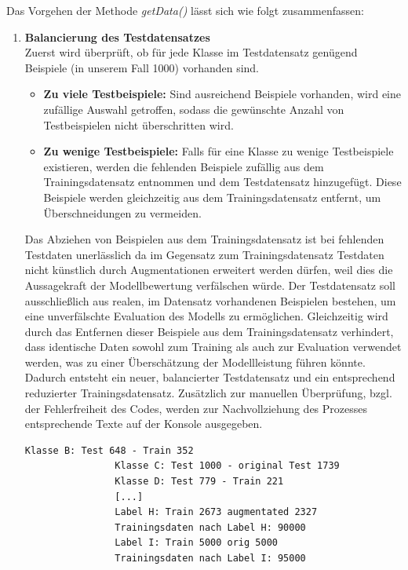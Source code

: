 \documentclass[12pt,oneside]{article}
\begin{document}
			Das Vorgehen der Methode \textit{getData()} lässt sich wie folgt zusammenfassen:
			\begin{enumerate}
				\item \textbf{Balancierung des Testdatensatzes} \\
				Zuerst wird überprüft, ob für jede Klasse im Testdatensatz genügend Beispiele (in unserem Fall 1000) vorhanden sind.
				\begin{itemize}
					\item \textbf{Zu viele Testbeispiele:} Sind ausreichend Beispiele vorhanden, wird eine zufällige Auswahl getroffen, sodass die gewünschte Anzahl von Testbeispielen nicht überschritten wird.
					\item \textbf{Zu wenige Testbeispiele:} Falls für eine Klasse zu wenige Testbeispiele existieren, werden die fehlenden Beispiele zufällig aus dem Trainingsdatensatz entnommen und dem Testdatensatz hinzugefügt. Diese Beispiele werden gleichzeitig aus dem Trainingsdatensatz entfernt, um Überschneidungen zu vermeiden.
				\end{itemize}
				
				Das Abziehen von Beispielen aus dem Trainingsdatensatz ist bei fehlenden Testdaten unerlässlich da im Gegensatz zum Trainingsdatensatz Testdaten nicht künstlich durch Augmentationen erweitert werden dürfen, weil dies die Aussagekraft der Modellbewertung verfälschen würde. Der Testdatensatz soll ausschließlich aus realen, im Datensatz vorhandenen Beispielen bestehen, um eine unverfälschte Evaluation des Modells zu ermöglichen. Gleichzeitig wird durch das Entfernen dieser Beispiele aus dem Trainingsdatensatz verhindert, dass identische Daten sowohl zum Training als auch zur Evaluation verwendet werden, was zu einer Überschätzung der Modellleistung führen könnte. Dadurch entsteht ein neuer, balancierter Testdatensatz und ein entsprechend reduzierter Trainingsdatensatz. Zusätzlich zur manuellen Überprüfung, bzgl. der Fehlerfreiheit des Codes, werden zur Nachvollziehung des Prozesses entsprechende Texte auf der Konsole ausgegeben. 
				\begin{lstlisting}[basicstyle=\small\ttfamily]
				Klasse B: Test 648 - Train 352
				Klasse C: Test 1000 - original Test 1739
				Klasse D: Test 779 - Train 221
				[...]
				Label H: Train 2673 augmentated 2327
				Trainingsdaten nach Label H: 90000
				Label I: Train 5000 orig 5000
				Trainingsdaten nach Label I: 95000
				\end{lstlisting}
			

\end{enumerate}
\end{document}
